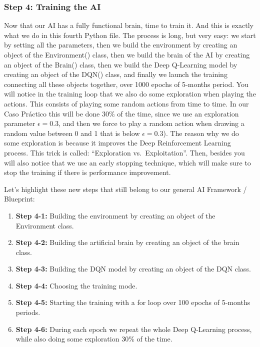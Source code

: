 \documentclass[]{book}
\begin{document}
\newpage

\subsubsection{Step 4: Training the AI}

Now that our AI has a fully functional brain, time to train it. And this is exactly what we do in this fourth Python file. The process is long, but very easy: we start by setting all the parameters, then we build the environment by creating an object of the Environment() class, then we build the brain of the AI by creating an object of the Brain() class, then we build the Deep Q-Learning model by creating an object of the DQN() class, and finally we launch the training connecting all these objects together, over 1000 epochs of 5-months period. You will notice in the training loop that we also do some exploration when playing the actions. This consists of playing some random actions from time to time. In our Caso Práctico this will be done 30\% of the time, since we use an exploration parameter \(\epsilon = 0.3\), and then we force to play a random action when drawing a random value between 0 and 1 that is below \(\epsilon = 0.3\)). The reason why we do some exploration is because it improves the Deep Reinforcement Learning process. This trick is called: ``Exploration vs.~Exploitation''. Then, besides you will also notice that we use an early stopping technique, which will make sure to stop the training if there is performance improvement.

Let's highlight these new steps that still belong to our general AI Framework / Blueprint:

\begin{enumerate}
    \item \textbf{Step 4-1:} Building the environment by creating an object of the Environment class.
    \item \textbf{Step 4-2:} Building the artificial brain by creating an object of the brain class.
    \item \textbf{Step 4-3:} Building the DQN model by creating an object of the DQN class.
    \item \textbf{Step 4-4:} Choosing the training mode.
    \item \textbf{Step 4-5:} Starting the training with a for loop over 100 epochs of 5-months periods.
    \item \textbf{Step 4-6:} During each epoch we repeat the whole Deep Q-Learning process, while also doing some exploration 30\% of the time.
\end{enumerate}
\end{document}
